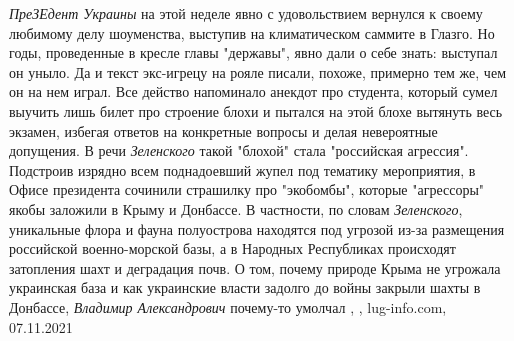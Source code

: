  
 
 
 
 

\emph{ПреЗЕдент Украины} на этой неделе явно с удовольствием вернулся к своему
любимому делу шоуменства, выступив на климатическом саммите в Глазго. Но годы,
проведенные в кресле главы "державы", явно дали о себе знать: выступал он
уныло.  Да и текст экс-игрецу на рояле писали, похоже, примерно тем же, чем он
на нем играл. Все действо напоминало анекдот про студента, который сумел
выучить лишь билет про строение блохи и пытался на этой блохе вытянуть весь
экзамен, избегая ответов на конкретные вопросы и делая невероятные допущения.
В речи \emph{Зеленского} такой "блохой" стала "российская агрессия". Подстроив
изрядно всем поднадоевший жупел под тематику мероприятия, в Офисе президента
сочинили страшилку про "экобомбы", которые "агрессоры" якобы заложили в Крыму и
Донбассе. В частности, по словам \emph{Зеленского}, уникальные флора и фауна
полуострова находятся под угрозой из-за размещения российской военно-морской
базы, а в Народных Республиках происходят затопления шахт и деградация почв. О
том, почему природе Крыма не угрожала украинская база и как украинские власти
задолго до войны закрыли шахты в Донбассе, \emph{Владимир Александрович} почему-то
умолчал
, 
, lug-info.com, 07.11.2021
